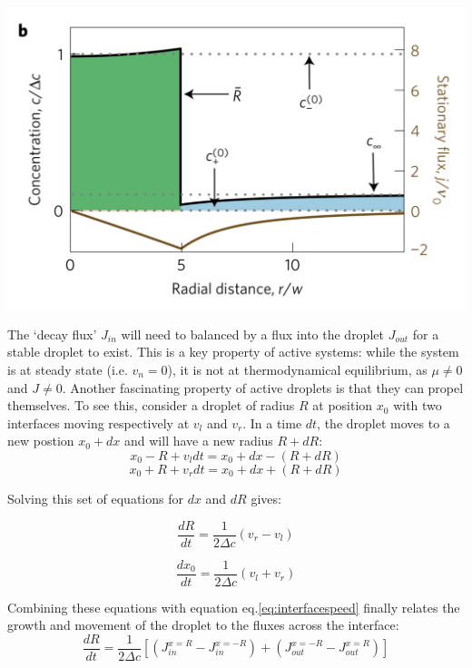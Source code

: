 \documentclass{Dissertate}
\let\origfigure\figure
\let\endorigfigure\endfigure
\renewenvironment{figure}[1][2] {
    \expandafter\origfigure\expandafter[H]
} {
    \endorigfigure
}
\begin{document}
\begin{figure}
\hypertarget{fig:activedroplet}{%
\centering
\includegraphics{source/figures/png/activedroplet.png}
\caption{Typical concentration profile of active droplet. Taken from
21}\label{fig:activedroplet}
}
\end{figure}

The `decay flux' \(J_{in}\) will need to balanced by a flux into the
droplet \(J_{out}\) for a stable droplet to exist. This is a key
property of active systems: while the system is at steady state (i.e.
\(v_n=0\)), it is not at thermodynamical equilibrium, as \(\mu \neq 0\)
and \(J\neq0\). Another fascinating property of active droplets is that
they can propel themselves. To see this, consider a droplet of radius
\(R\) at position \(x_0\) with two interfaces moving respectively at
\(v_l\) and \(v_r\). In a time \(dt\), the droplet moves to a new
postion \(x_0+dx\) and will have a new radius \(R+dR\): \[
x_0-R+v_ldt=x_0+dx-(R+dR)
\] \[
x_0+R+v_rdt=x_0+dx+(R+dR)
\]

Solving this set of equations for \(dx\) and \(dR\) gives:

\begin{equation}
\frac{dR}{dt}=\frac{1}{2\Delta c}(v_r-v_l)
\label{eq:radius}\end{equation}

\begin{equation}
\frac{dx_0}{dt}=\frac{1}{2\Delta c}(v_l+v_r)
\label{eq:position}\end{equation}

Combining these equations with equation eq.\ref{eq:interfacespeed}
finally relates the growth and movement of the droplet to the fluxes
across the interface: \[
\frac{dR}{dt}=\frac{1}{2\Delta c}\left[(J_{in}^{x=R}-J_{in}^{x=-R})+(J_{out}^{x=-R}-J_{out}^{x=R})\right]
\]
\end{document}
